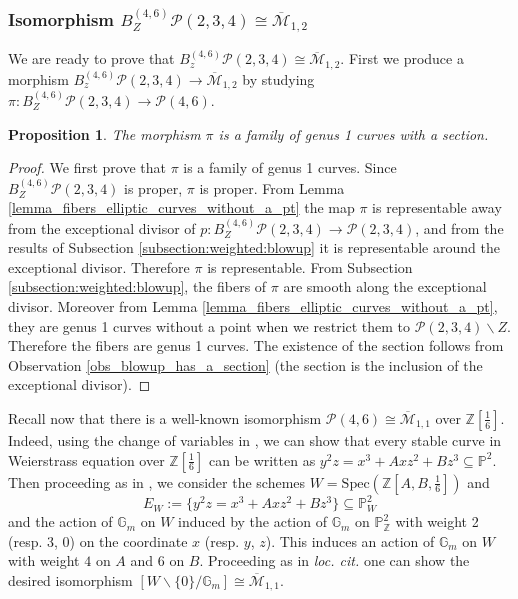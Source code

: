 \documentclass[11pt]{amsart}
\newtheorem{prop}[theorem]{Proposition}
\theoremstyle{definition}
\theoremstyle{remark}
\newcommand{\bP}{{\mathbb P}}
\newcommand{\calM}{\mathcal M}
\newcommand{\calP}{\mathcal P}
\newcommand{\bG}{\mathbb{G}}
\newcommand{\Spec}{\mathrm{Spec}}
\begin{document}
\subsubsection{Isomorphism $B_Z^{(4,6)}\calP(2,3,4) \cong \overline{\calM}_{1,2}$} We are ready to prove that $B_z^{(4,6)}\calP(2,3,4) \cong \overline{\calM}_{1,2}$. First we produce a morphism $B_z^{(4,6)}\calP(2,3,4) \to \overline{\calM}_{1,2}$ by studying $\pi:B_Z^{(4,6)}\calP(2,3,4) \to \calP(4,6)$.
\begin{prop}\label{prop_family_of_ellpitic} The morphism
$\pi$ is a family of genus 1 curves with a section.  
\end{prop}
\begin{proof}
We first prove that $\pi$ is a family of genus 1 curves. Since $B_Z^{(4,6)}\calP(2,3,4)$ is proper, $\pi$ is proper. From Lemma \ref{lemma_fibers_elliptic_curves_without_a_pt} the map
$\pi$ is representable away from the exceptional divisor of $p:B_Z^{(4,6)}\calP(2,3,4) \to \calP(2,3,4)$, and from the results of Subsection \ref{subsection:weighted:blowup} it is representable around the exceptional divisor. Therefore $\pi$ is representable. From Subsection \ref{subsection:weighted:blowup}, the fibers of $\pi$ are smooth along the exceptional divisor. Moreover from Lemma \ref{lemma_fibers_elliptic_curves_without_a_pt}, they are genus 1 curves without a point when we restrict them to $\calP(2,3,4)\smallsetminus Z$. Therefore the fibers are genus 1 curves. 
The existence of the section follows from Observation \ref{obs_blowup_has_a_section} (the section is the inclusion of the exceptional divisor).
\end{proof}

Recall now that there is a well-known isomorphism $\calP(4,6)\cong \overline{\calM}_{1,1}$ over $\mathbb{Z}[\frac{1}{6}]$. Indeed, using the change of variables in \cite[Section III.1]{Silverman}, we can show that every stable curve in Weierstrass equation over $\mathbb{Z}[\frac{1}{6}]$ can be written as $y^2z = x^3 + Axz^2+Bz^3\subseteq \bP^2$. Then proceeding as in \cite[\href{https://stacks.math.columbia.edu/tag/072S}{Tag 072S}]{stacks-project}, we consider the schemes $W =\Spec( \mathbb{Z}[A,B,\frac{1}{6}])$ and $$E_W:=\{y^2z = x^3 + Axz^2+Bz^3\}\subseteq \mathbb{P}^2_W$$
and the action of $\bG_m$ on $W$ induced by the action of $\bG_m$ on $\mathbb{P}^2_{\mathbb{Z}}$ with weight 2 (resp. 3, 0) on the coordinate $x$ (resp. $y$, $z$). This induces an action of $\bG_m$ on $W$ with weight $4$ on $A$
 and $6$ on $B$. Proceeding as in \emph{loc. cit.} one can show the desired isomorphism $[W\smallsetminus \{0\}/\bG_m]\cong \overline{\calM}_{1,1}$.
 
\end{document}
